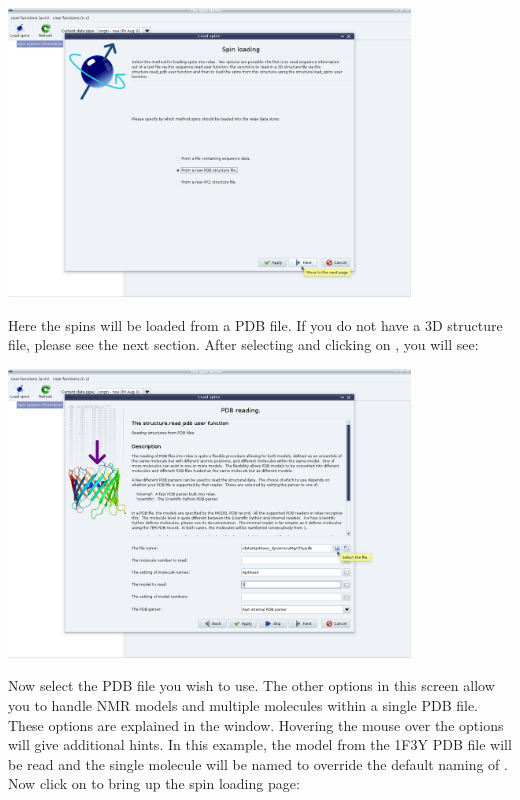 \begin{minipage}[h]{\linewidth}
\centerline{\includegraphics[width=0.8\textwidth, bb=14 14 1415 1019]{graphics/screenshots/spin_viewer/wizard_start}}
\label{figure: spin viewer wizard start}
\end{minipage}

Here the spins will be loaded from a PDB file.  If you do not have a 3D structure file, please see the next section.  After selecting  and clicking on , you will see:

\begin{minipage}[h]{\linewidth}
\centerline{\includegraphics[width=0.8\textwidth, bb=14 14 1415 1019]{graphics/screenshots/spin_viewer/wizard_read_pdb}}
\end{minipage}

Now select the PDB file you wish to use.  The other options in this screen allow you to handle NMR models and multiple molecules within a single PDB file.  These options are explained in the window.  Hovering the mouse over the options will give additional hints.  In this example, the  model from the 1F3Y PDB file will be read and the single molecule will be named  to override the default naming of .  Now click on  to bring up the spin loading page:

